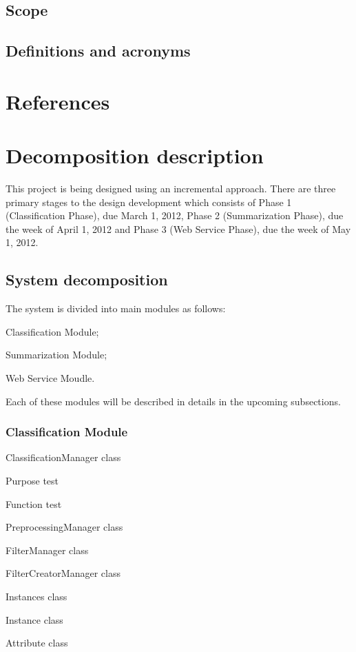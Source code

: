 \documentclass[12pt]{article}
\newenvironment{my_itemize}
{\begin{itemize}
  \setlength{\itemsep}{0cm}
  \setlength{\parskip}{0cm}}
{\end{itemize}}
\newenvironment{my_desc}
{\begin{description}
  \setlength{\itemsep}{0cm}
  \setlength{\parskip}{0cm}}
{\end{description}}
\begin{document}
\subsection{Scope}
\subsection{Definitions and acronyms}

\section{References}

\section{Decomposition description}
This project is being designed using an incremental approach. There are three primary stages to the design development which consists of Phase 1 (Classification Phase), due March 1, 2012, Phase 2 (Summarization Phase), due the week of April 1, 2012 and Phase 3 (Web Service Phase), due the week of May 1, 2012.

\subsection{System decomposition}
The system is divided into main modules as follows:
\begin{my_itemize}
\item Classification Module;
\item Summarization Module;
\item Web Service Moudle.
\end{my_itemize}
Each of these modules will be described in details in the upcoming subsections.

\subsubsection{Classification Module}

\begin{my_itemize}
  \item ClassificationManager class
  \begin{my_desc}
   \item[Purpose] test
   \item[Function] test
  \end{my_desc}
  \item PreprocessingManager class
  \item FilterManager class
  \item FilterCreatorManager class
  \item Instances class
  \item Instance class
  \item Attribute class
\end{my_itemize}
\end{document}
